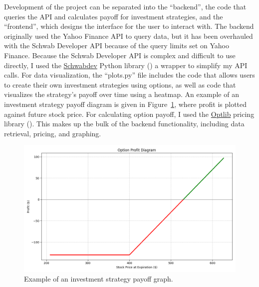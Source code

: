 \documentclass{article}
\begin{document}
\indent Development of the project can be separated into the \enquote{backend}, the code that queries the API and calculates payoff for investment strategies, and the \enquote{frontend}, which designs the interface for the user to interact with. The backend originally used the Yahoo Finance API to query data, but it has been overhauled with the Schwab Developer API because of the query limits set on Yahoo Finance. Because the Schwab Developer API is complex and difficult to use directly, I used the \href{https://github.com/tylerebowers/Schwab-API-Python}{Schwabdev} Python library (\cite{schwabdev}) a wrapper to simplify my API calls. For data visualization, the \enquote{plots.py} file includes the code that allows users to create their own investment strategies using options, as well as code that visualizes the strategy's payoff over time using a heatmap. An example of an investment strategy payoff diagram is given in Figure~\ref{fig:Figure 3}, where profit is plotted against future stock price. For calculating option payoff, I used the \href{https://github.com/dbrojas/optlib/tree/master}{Optlib}  pricing library (\cite{optlib}). This makes up the bulk of the backend functionality, including data retrieval, pricing, and graphing. 

\begin{figure}
    \begin{center}
    \includegraphics[width=\textwidth,height=\textheight,keepaspectratio]{long_call.png}
    \caption{\label{fig:Figure 3}Example of an investment strategy payoff graph.}
    \end{center}
\end{figure}
\end{document}
